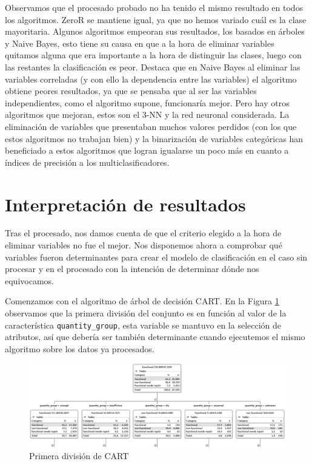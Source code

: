 \documentclass[a4paper, 20pt]{article}
\begin{document}
Observamos que el procesado probado no ha tenido el mismo resultado en todos los algoritmos. ZeroR se mantiene igual, ya que no hemos variado cuál es la clase mayoritaria. Algunos algoritmos empeoran sus resultados, los basados en árboles y Naive Bayes, esto tiene su causa en que a la hora de eliminar variables quitamos alguna que era importante a la hora de distinguir las clases, luego con las restantes la clasificación es peor. Destaca que en Naive Bayes al eliminar las variables correladas (y con ello la dependencia entre las variables) el algoritmo obtiene peores resultados, ya que se pensaba que al ser las variables independientes, como el algoritmo supone, funcionaría mejor. Pero hay otros algoritmos que mejoran, estos son el 3-NN y la red neuronal considerada. La eliminación de variables que presentaban muchos valores perdidos (con los que estos algoritmos no trabajan bien) y la binarización de variables categóricas han beneficiado a estos algoritmos que logran igualarse un poco más en cuanto a índices de precisión a los multiclasificadores.

\section{Interpretación de resultados}

Tras el procesado, nos damos cuenta de que el criterio elegido a la hora de eliminar variables no fue el mejor. Nos disponemos ahora a comprobar qué variables fueron determinantes para crear el modelo de clasificación en el caso sin procesar y en el procesado con la intención de determinar dónde nos equivocamos.

Comenzamos con el algoritmo de árbol de decisión CART. En la Figura \ref{fig:CART1} observamos que la primera división del conjunto es en función al valor de la característica \texttt{quantity\_group}, esta variable se mantuvo en la selección de atributos, así que debería ser también determinante cuando ejecutemos el mismo algoritmo sobre los datos ya procesados.

\begin{figure}[H]
    \centering
    \includegraphics[width=1\textwidth]{CART1}
    \caption{Primera división de CART}
    \label{fig:CART1}
\end{figure}
\end{document}
